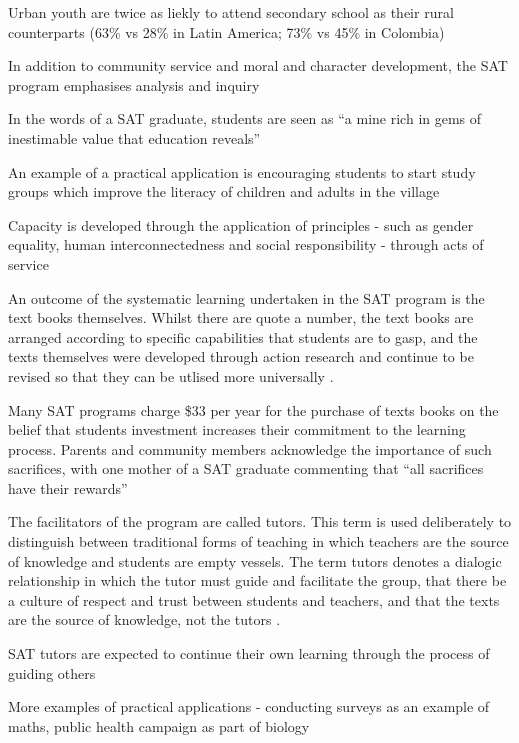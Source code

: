 Urban youth are twice as liekly to attend secondary school as their rural counterparts (63\% vs 28\% in Latin America; 73\% vs 45\% in Colombia) \citep{Kwauk2016}


In addition to community service and moral and character development, the SAT program emphasises analysis and inquiry \citep{Kwauk2016}

In the words of a SAT graduate, students are seen as “a mine rich in gems of inestimable value that education reveals” \citep{Kwauk2016}

An example of a practical application is encouraging students to start study groups which improve the literacy of children and adults in the village \citep{Kwauk2016}

Capacity is developed through the application of principles - such as gender equality, human interconnectedness and social responsibility - through acts of service \citep{Kwauk2016}

An outcome of the systematic learning undertaken in the SAT program is the text books themselves. Whilst there are quote a number, the text books are arranged according to specific capabilities that students are to gasp, and the texts themselves were developed through action research and continue to be revised so that they can be utlised more universally \citep{Kwauk2016}.

Many SAT programs charge \$33 per year for the purchase of texts books on the belief that students investment increases their commitment to the learning process. Parents and community members acknowledge the importance of such sacrifices, with one mother of a SAT graduate commenting that “all sacrifices have their rewards” \citep{Kwauk2016}

The facilitators of the program are called tutors. This term is used deliberately to distinguish between traditional forms of teaching in which teachers are the source of knowledge and students are empty vessels. The term tutors denotes a dialogic relationship in which the tutor must guide and facilitate the group, that there be a culture of respect and trust between students and teachers, and that the texts are the source of knowledge, not the tutors \citep{Kwauk2016}.

SAT tutors are expected to continue their own learning through the process of guiding others \citep{Kwauk2016}

More examples of practical applications - conducting surveys as an example of maths, public health campaign as part of biology \citep{Kwauk2016}


